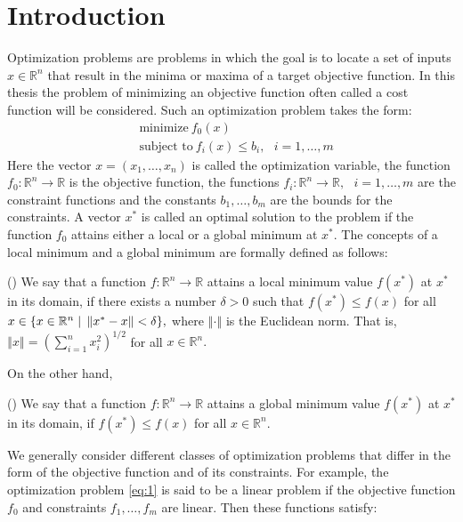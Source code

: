 \section{Introduction}\label{intro}
Optimization problems are problems in which the goal is to locate a set of inputs $x \in \mathbb{R}^{n}$ that result in the minima or maxima of a target objective function. In this thesis the problem of minimizing an objective function often called a cost function will be considered. Such an optimization problem takes the form:
\begin{equation*}\label{eq:1}\tag{2.1}
\begin{aligned}
    &\text{minimize} \ f_{0}(x) \\
    &\text{subject to} \ f_{i}(x) \leq b_{i}, \text{  } i=1,\ldots,m 
\end{aligned}
\end{equation*}
Here the vector $x=(x_{1},\ldots,x_{n})$ is called the optimization variable, the function $f_{0}: \mathbb{R}^{n} \longrightarrow \mathbb{R}$ is the objective function, the functions $f_{i}: \mathbb{R}^{n} \longrightarrow \mathbb{R}, \text{  }i=1,\ldots,m$ are the constraint functions and the constants $b_{1},\ldots,b_{m}$ are the bounds for the constraints. A vector $x^{*}$ is called an optimal solution to the problem if the function $f_{0}$ attains either a local or a global minimum at $x^{*}$. The concepts of a local minimum and a global minimum are formally defined as follows:
\begin{definition}(\cite[235]{adams2013calculus})\label{local_min}
We say that a function $f:\mathbb{R}^{n}\rightarrow\mathbb{R}$ attains a local minimum value $f(x^{*})$ at $x^{*}$ in its domain, if there exists a number $\delta > 0$ such that $f(x^{*})\leq f(x)$ for all $x\in\{x\in\mathbb{R}^{n} \hspace{0.1cm}|\hspace{0.1cm}\left\Vert x^{*}-x \right\Vert<\delta\},$ where $\left\Vert\cdot\right\Vert$ is the Euclidean norm. That is, $\left\Vert x \right\Vert = \left(\sum_{i=1}^{n}x_{i}^{2}\right)^{1/2}$ for all $x\in\mathbb{R}^{n}.$
\end{definition}
On the other hand,
\begin{definition}(\cite[746]{adams2013calculus})\label{global_min}
We say that a function $f:\mathbb{R}^{n}\rightarrow\mathbb{R}$ attains a global minimum value $f(x^{*})$ at $x^{*}$ in its domain, if $f(x^{*})\leq f(x)$ for all $x\in\mathbb{R}^{n}.$
\end{definition}     
We generally consider different classes of optimization problems that differ in the form of the objective function and of its constraints. For example, the optimization problem \eqref{eq:1} is said to be a linear problem if the objective function $f_{0}$ and constraints $f_{1},\ldots,f_{m}$ are linear. Then these functions satisfy:
